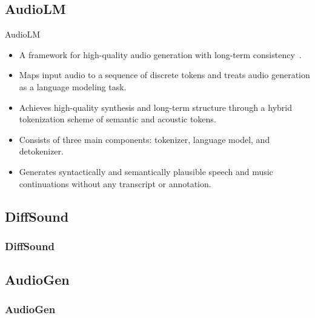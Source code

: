 \subsection{AudioLM}
\begin{frame}{AudioLM}
    \begin{itemize}
        \item A framework for high-quality audio generation with long-term consistency~\cite{borsos_audiolm_2022}.
        \item Maps input audio to a sequence of discrete tokens and treats audio generation as a language modeling task.
        \item Achieves high-quality synthesis and long-term structure through a hybrid tokenization scheme of semantic and acoustic tokens.
        \item Consists of three main components: tokenizer, language model, and detokenizer.
        \item Generates syntactically and semantically plausible speech and music continuations without any transcript or annotation.
    \end{itemize}
\end{frame}

\subsection{DiffSound}
\begin{frame}
    \frametitle{DiffSound}
\end{frame}

\subsection{AudioGen}
\begin{frame}
    \frametitle{AudioGen}
\end{frame}